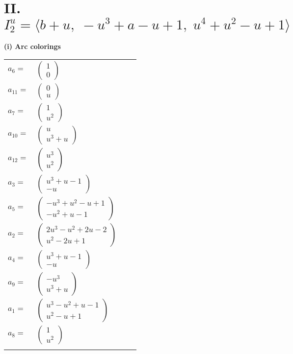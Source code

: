 \documentclass[1p]{elsarticle_modified}
\theoremstyle{definition}
\begin{document}
\centering \section*{II. $I^u_{2}= \langle b+u,\;- u^3+a- u+1,\;u^4+u^2- u+1 \rangle$}
\flushleft \textbf{(i) Arc colorings}\\
\begin{tabular}{m{7pt} m{180pt} m{7pt} m{180pt} }
\flushright $a_{6}=$&$\begin{pmatrix}1\\0\end{pmatrix}$ \\
\flushright $a_{11}=$&$\begin{pmatrix}0\\u\end{pmatrix}$ \\
\flushright $a_{7}=$&$\begin{pmatrix}1\\u^2\end{pmatrix}$ \\
\flushright $a_{10}=$&$\begin{pmatrix}u\\u^3+u\end{pmatrix}$ \\
\flushright $a_{12}=$&$\begin{pmatrix}u^3\\u^2\end{pmatrix}$ \\
\flushright $a_{3}=$&$\begin{pmatrix}u^3+u-1\\- u\end{pmatrix}$ \\
\flushright $a_{5}=$&$\begin{pmatrix}- u^3+u^2- u+1\\- u^2+u-1\end{pmatrix}$ \\
\flushright $a_{2}=$&$\begin{pmatrix}2 u^3- u^2+2 u-2\\u^2-2 u+1\end{pmatrix}$ \\
\flushright $a_{4}=$&$\begin{pmatrix}u^3+u-1\\- u\end{pmatrix}$ \\
\flushright $a_{9}=$&$\begin{pmatrix}- u^3\\u^3+u\end{pmatrix}$ \\
\flushright $a_{1}=$&$\begin{pmatrix}u^3- u^2+u-1\\u^2- u+1\end{pmatrix}$ \\
\flushright $a_{8}=$&$\begin{pmatrix}1\\u^2\end{pmatrix}$\\&\end{tabular}
\end{document}
